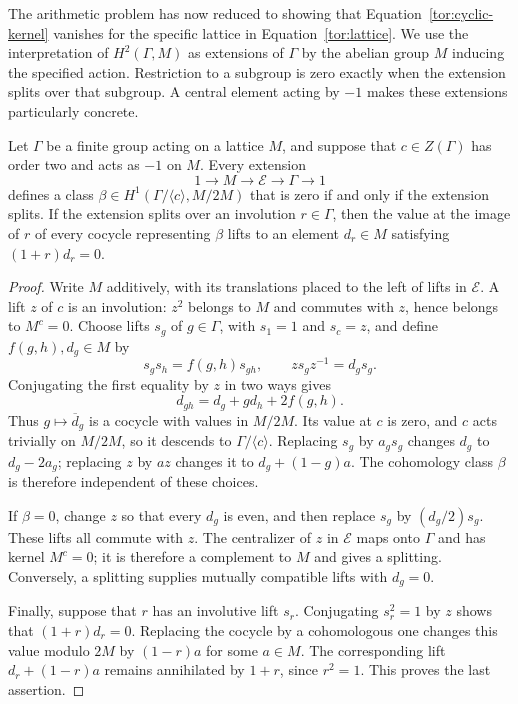 The arithmetic problem has now reduced to showing that
Equation~\eqref{tor:cyclic-kernel} vanishes for the specific lattice
in Equation~\eqref{tor:lattice}.
We use the interpretation of $H^2(\Gamma,M)$ as extensions of
$\Gamma$ by the abelian group $M$ inducing the specified action.
Restriction to a subgroup is zero exactly when the extension
splits over that subgroup.  A central element acting by $-1$
makes these extensions particularly concrete.

\begin{lemma}\label{tor:sign-element}
Let $\Gamma$ be a finite group acting on a lattice $M$, and suppose
that $c\in Z(\Gamma)$ has order two and acts as $-1$ on $M$.
Every extension
\[
 1\longrightarrow M\longrightarrow\mathcal E
                       \longrightarrow\Gamma\longrightarrow1
\]
defines a class
$\beta\in H^1(\Gamma/\langle c\rangle,M/2M)$ that is zero
if and only if the extension splits.
If the extension splits over an involution $r\in\Gamma$, then
the value at the image of $r$ of every cocycle representing
$\beta$ lifts to an element $d_r\in M$ satisfying
$(1+r)d_r=0$.
\end{lemma}

\begin{proof}
Write $M$ additively, with its translations placed to the left
of lifts in $\mathcal E$.  A lift $z$ of $c$ is an involution:
$z^2$ belongs to $M$ and commutes with $z$, hence belongs to
$M^c=0$.  Choose lifts $s_g$ of $g\in\Gamma$, with $s_1=1$
and $s_c=z$, and define $f(g,h),d_g\in M$ by
\[
 s_gs_h=f(g,h)s_{gh},\qquad
                   zs_gz^{-1}=d_gs_g.
\]
Conjugating the first equality by $z$ in two ways gives
\begin{equation}\label{tor:sign-cocycle}
                    d_{gh}=d_g+g d_h+2f(g,h).
\end{equation}
Thus $g\mapsto\overline d_g$ is a cocycle with values in $M/2M$.
Its value at $c$ is zero, and $c$ acts trivially on $M/2M$, so
it descends to $\Gamma/\langle c\rangle$.
Replacing $s_g$ by $a_gs_g$ changes $d_g$ to $d_g-2a_g$;
replacing $z$ by $az$ changes it to $d_g+(1-g)a$.
The cohomology class $\beta$ is therefore independent of these
choices.

If $\beta=0$, change $z$ so that every $d_g$ is even, and then
replace $s_g$ by $(d_g/2)s_g$.  These lifts all commute with $z$.
The centralizer of $z$ in $\mathcal E$ maps onto $\Gamma$ and
has kernel $M^c=0$; it is therefore a complement to $M$ and gives
a splitting.  Conversely, a splitting supplies mutually compatible
lifts with $d_g=0$.

Finally, suppose that $r$ has an involutive lift $s_r$.
Conjugating $s_r^2=1$ by $z$ shows that
$(1+r)d_r=0$.  Replacing the cocycle by a cohomologous one changes
this value modulo $2M$ by $(1-r)a$ for some $a\in M$.
The corresponding lift $d_r+(1-r)a$ remains annihilated by $1+r$,
since $r^2=1$.  This proves the last assertion.
\end{proof}

